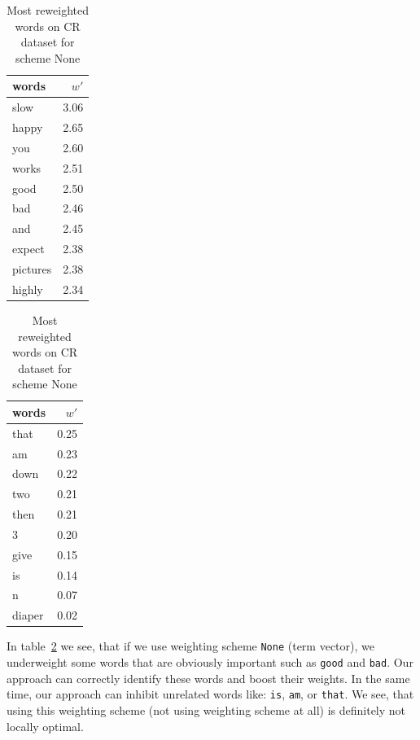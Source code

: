 \begin{table}[H]
    \centering
    \begin{minipage}{.4\linewidth}
      \centering
        \begin{tabular}{lr}
\toprule
    words &  $w'$ \\
\midrule
     slow &  3.06 \\
    happy &  2.65 \\
      you &  2.60 \\
    works &  2.51 \\
     good &  2.50 \\
      bad &  2.46 \\
      and &  2.45 \\
   expect &  2.38 \\
 pictures &  2.38 \\
   highly &  2.34 \\
\bottomrule
\end{tabular}

    \end{minipage}
    \begin{minipage}{.4\linewidth}
      \centering
        \begin{tabular}{lr}
\toprule
  words &  $w'$ \\
\midrule
   that &  0.25 \\
     am &  0.23 \\
   down &  0.22 \\
    two &  0.21 \\
   then &  0.21 \\
      3 &  0.20 \\
   give &  0.15 \\
     is &  0.14 \\
      n &  0.07 \\
 diaper &  0.02 \\
\bottomrule
\end{tabular}

    \end{minipage} 
    \caption{Most reweighted words on CR dataset for scheme None}
    \label{tab:words:CR:None}
\end{table}

    In table~\ref{tab:words:CR:None} we see, that if we use weighting scheme \texttt{None} (term vector), 
    we underweight some words that are obviously important such as \texttt{good} and \texttt{bad}.
    Our approach can correctly identify these words and boost their weights.
    In the same time, our approach can inhibit unrelated words like: \texttt{is}, \texttt{am}, or \texttt{that}.
    We see, that using this weighting scheme (not using weighting scheme at all) is definitely not locally optimal.
    
